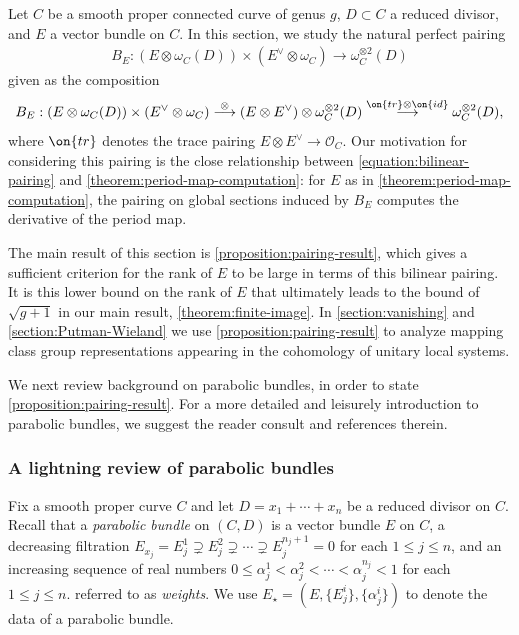 \documentclass[12 pt]{amsart}
\theoremstyle{plain}
\theoremstyle{definition}
\theoremstyle{remark}
\numberwithin{equation}{section}
\begin{document}
Let $C$ be a smooth proper connected curve of genus $g$, $D\subset C$ a reduced divisor, and $E$
a vector bundle on $C$. 
In this section, we study the natural perfect pairing
\begin{align}
	\label{equation:bilinear-pairing}
	B_E:
(E \otimes \omega_C(D))\times (E^\vee\otimes \omega_C) \to
\omega_C^{\otimes 2}(D)
\end{align}
given as the composition $$B_E: (E \otimes \omega_C(D))\times (E^\vee\otimes \omega_C)\overset{\otimes}{\longrightarrow} (E\otimes E^\vee)\otimes \omega_C^{\otimes 2}(D)\overset{\on{tr}\otimes \on{id}}{\longrightarrow} \omega_C^{\otimes 2}(D),$$
where $\on{tr}$ denotes the trace pairing ${E}\otimes {E}^\vee\to
\mathscr{O}_C.$ 
Our motivation for considering this pairing is the close relationship between
\eqref{equation:bilinear-pairing} and
\autoref{theorem:period-map-computation}: for $E$ as in \autoref{theorem:period-map-computation}, the pairing on global sections induced by $B_E$ computes the derivative of the period map.

The main result of this section is \autoref{proposition:pairing-result},
which gives a sufficient criterion for the rank of $E$ to be large in terms of
this bilinear pairing. It is this lower bound on the
rank of $E$ that ultimately leads to the bound of $\sqrt{g+1}$ in our main result,
\autoref{theorem:finite-image}.
In \autoref{section:vanishing} and \autoref{section:Putman-Wieland} we use
\autoref{proposition:pairing-result} to analyze mapping class group representations appearing in the
cohomology of unitary local systems. 

We next review background on parabolic bundles, in order to state
\autoref{proposition:pairing-result}.
For a more detailed and leisurely introduction to parabolic bundles, we suggest
the reader consult
\cite[\S2]{LL:geometric-local-systems}
and references therein.

\subsubsection{A lightning review of parabolic bundles}

Fix a smooth proper curve $C$ and let $D = x_1 + \cdots + x_n$ be a reduced divisor on
$C$. 
Recall that a {\em parabolic bundle} on $(C,D)$ is a vector bundle $E$ on $C$, a
decreasing filtration $E_{x_j} = E_j^1 \supsetneq E_j^2 \supsetneq \cdots
\supsetneq E_j^{n_j+1} =
0$ for each $1 \leq j \leq n$, and an increasing sequence of real numbers $0\leq
\alpha_j^1<\alpha_j^2<\cdots<\alpha_j^{n_j}<1$ for each $1 \leq j \leq n$.
referred to as {\em weights}. 
We use $E_\star = (E, \{E^i_j\}, \{\alpha^i_j\})$ to denote the data of a parabolic bundle.
\end{document}
